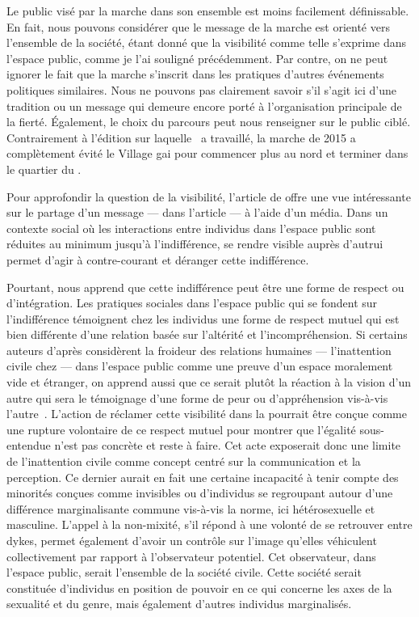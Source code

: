 Le public visé par la marche dans son ensemble est moins facilement définissable. 
En fait, nous pouvons considérer que le message de la marche est orienté vers l'ensemble de la société, étant donné que la visibilité comme telle s'exprime dans l'espace public, comme je l'ai souligné précédemment. 
Par contre, on ne peut ignorer le fait que la marche s'inscrit dans les pratiques d'autres événements politiques similaires. 
Nous ne pouvons pas clairement savoir s'il s'agit ici d'une tradition ou un message qui demeure encore porté à l'organisation principale de la fierté. 
Également, le choix du parcours peut nous renseigner sur le public ciblé. 
Contrairement à l'édition sur laquelle~\citet{Podmore2015a} a travaillé, la marche de 2015 a complètement évité le Village gai pour commencer plus au nord et terminer dans le quartier du .

Pour approfondir la question de la visibilité, l'article de \citet{Frosh2006}  offre une vue intéressante sur le partage d'un message ---  dans l'article --- à l'aide d'un média. 
Dans un contexte social où les interactions entre individus dans l'espace public sont réduites au minimum jusqu'à l'indifférence, se rendre visible auprès d'autrui permet d'agir à contre-courant et déranger cette indifférence. 

Pourtant, \citeauthor{Frosh2006} nous apprend que cette indifférence peut être une forme de respect ou d'intégration. 
Les pratiques sociales dans l'espace public qui se fondent sur l'indifférence témoignent chez les individus une forme de respect mutuel qui est bien différente d'une relation basée sur l'altérité et l'incompréhension. 
Si certains auteurs d'après \citeauthor{Frosh2006} considèrent la froideur des relations humaines --- l'inattention civile chez \citeauthor{Goffman1956} --- dans l'espace public comme une preuve d'un espace moralement vide et étranger, on apprend aussi que ce serait plutôt la réaction à la vision d'un autre qui sera le témoignage d'une forme de peur ou d'appréhension vis-à-vis l'autre~\citep[279--280]{Frosh2006}. 
L'action de réclamer cette visibilité dans la \dm{} pourrait être conçue comme une rupture volontaire de ce respect mutuel pour montrer que l'égalité sous-entendue n'est pas concrète et reste à faire. 
Cet acte exposerait donc une limite de l'inattention civile comme concept centré sur la communication et la perception. 
Ce dernier aurait en fait une certaine incapacité à tenir compte des minorités conçues comme invisibles ou d'individus se regroupant autour d'une différence marginalisante commune vis-à-vis la norme, ici hétérosexuelle et masculine. 
L'appel à la non-mixité, s'il répond à une volonté de se retrouver entre dykes, permet également d'avoir un contrôle sur l'image qu'elles véhiculent collectivement par rapport à l'observateur potentiel.
Cet observateur, dans l'espace public, serait l'ensemble de la société civile. 
Cette société serait constituée d'individus en position de pouvoir en ce qui concerne les axes de la sexualité et du genre, mais également d'autres individus marginalisés.

